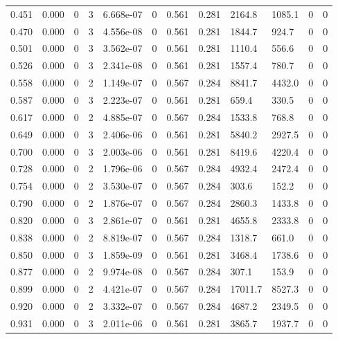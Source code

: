 \documentclass[preview]{standalone}
\begin{document}
{{\begin{tabular}{L{1.2cm}C{1.2cm} C{0.3cm}C{0.5cm} C{1.4cm}C{1.4cm} C{1.4cm}C{1.4cm} C{1.6cm}C{1.6cm} C{1.6cm}C{1.6cm}}
  0.451  &  0.000  & 0     &  3 &  6.668e-07  & 0  &  0.561&   0.281& 2164.8 & 1085.1   &  0 & 0  \\ 
  0.470  &  0.000  & 0     &  3 &  4.556e-08  & 0  &  0.561&   0.281& 1844.7 & 924.7   &  0 & 0  \\ 
  0.501  &  0.000  & 0     &  3 &  3.562e-07  & 0  &  0.561&   0.281& 1110.4 & 556.6   &  0 & 0  \\ 
  0.526  &  0.000  & 0     &  3 &  2.341e-08  & 0  &  0.561&   0.281& 1557.4 & 780.7   &  0 & 0  \\ 
  0.558  &  0.000  & 0     &  2 &  1.149e-07  & 0  &  0.567&   0.284& 8841.7 & 4432.0   &  0 & 0  \\ 
  0.587  &  0.000  & 0     &  3 &  2.223e-07  & 0  &  0.561&   0.281& 659.4 & 330.5   &  0 & 0  \\ 
  0.617  &  0.000  & 0     &  2 &  4.885e-07  & 0  &  0.567&   0.284& 1533.8 & 768.8   &  0 & 0  \\ 
  0.649  &  0.000  & 0     &  3 &  2.406e-06  & 0  &  0.561&   0.281& 5840.2 & 2927.5   &  0 & 0  \\ 
  0.700  &  0.000  & 0     &  3 &  2.003e-06  & 0  &  0.561&   0.281& 8419.6 & 4220.4   &  0 & 0  \\ 
  0.728  &  0.000  & 0     &  2 &  1.796e-06  & 0  &  0.567&   0.284& 4932.4 & 2472.4   &  0 & 0  \\ 
  0.754  &  0.000  & 0     &  2 &  3.530e-07  & 0  &  0.567&   0.284& 303.6 & 152.2   &  0 & 0  \\ 
  0.790  &  0.000  & 0     &  2 &  1.876e-07  & 0  &  0.567&   0.284& 2860.3 & 1433.8   &  0 & 0  \\ 
  0.820  &  0.000  & 0     &  3 &  2.861e-07  & 0  &  0.561&   0.281& 4655.8 & 2333.8   &  0 & 0  \\ 
  0.838  &  0.000  & 0     &  2 &  8.819e-07  & 0  &  0.567&   0.284& 1318.7 & 661.0   &  0 & 0  \\ 
  0.850  &  0.000  & 0     &  3 &  1.859e-09  & 0  &  0.561&   0.281& 3468.4 & 1738.6   &  0 & 0  \\ 
  0.877  &  0.000  & 0     &  2 &  9.974e-08  & 0  &  0.567&   0.284& 307.1 & 153.9   &  0 & 0  \\ 
  0.899  &  0.000  & 0     &  2 &  4.421e-07  & 0  &  0.567&   0.284& 17011.7 & 8527.3   &  0 & 0  \\ 
  0.920  &  0.000  & 0     &  2 &  3.332e-07  & 0  &  0.567&   0.284& 4687.2 & 2349.5   &  0 & 0  \\ 
  0.931  &  0.000  & 0     &  3 &  2.011e-06  & 0  &  0.561&   0.281& 3865.7 & 1937.7   &  0 & 0  \\ 

\end{tabular}}}
\end{document}
